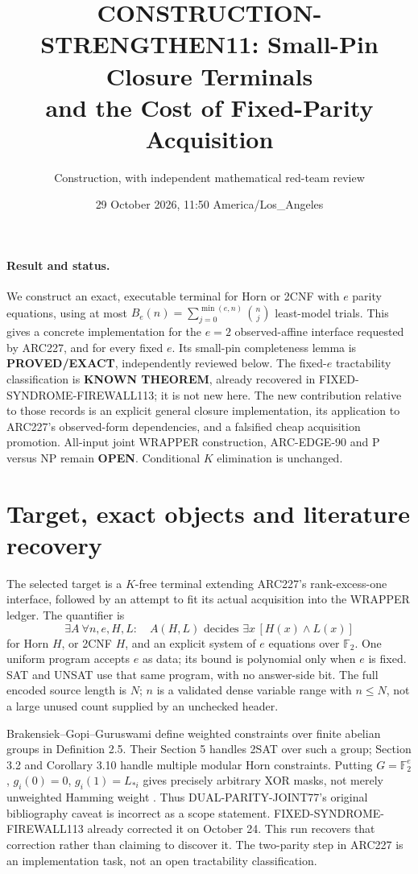 \documentclass[11pt]{article}
\title{CONSTRUCTION-STRENGTHEN11: Small-Pin Closure Terminals\\and the Cost of Fixed-Parity Acquisition}
\author{Construction, with independent mathematical red-team review}
\date{29 October 2026, 11:50 America/Los\_Angeles}
\newcommand{\F}{\mathbb F_2}
\begin{document}
\sloppy\maketitle

\paragraph{Result and status.}
We construct an exact, executable terminal for Horn or 2CNF with $e$ parity
equations, using at most $B_e(n)=\sum_{j=0}^{\min(e,n)}\binom nj$ least-model
trials. This gives a concrete implementation for the $e=2$ observed-affine
interface requested by ARC227, and for every fixed $e$. Its small-pin
completeness lemma is \textbf{PROVED/EXACT}, independently reviewed below.
The fixed-$e$ tractability classification is \textbf{KNOWN THEOREM}, already
recovered in FIXED-SYNDROME-FIREWALL113; it is not new here. The new contribution
relative to those records is an explicit general closure implementation,
its application to ARC227's observed-form dependencies, and a falsified cheap
acquisition promotion. All-input joint WRAPPER construction, ARC-EDGE-90 and
P versus NP remain \textbf{OPEN}. Conditional $K$ elimination is unchanged.

\section{Target, exact objects and literature recovery}
The selected target is a $K$-free terminal extending ARC227's rank-excess-one
interface, followed by an attempt to fit its actual acquisition into the
WRAPPER ledger. The quantifier is
\[
 \exists A\ \forall n,e,H,L:\quad
 A(H,L)\text{ decides }\exists x\,[H(x)\land L(x)]
\]
for Horn $H$, or 2CNF $H$, and an explicit system of $e$ equations over $\F$.
One uniform program accepts $e$ as data; its bound is polynomial only when
$e$ is fixed. SAT and UNSAT use that same program, with no answer-side bit.
The full encoded source length is $N$; $n$ is a validated dense variable
range with $n\le N$, not a large unused count supplied by an unchecked header.

Brakensiek--Gopi--Guruswami define weighted constraints over finite abelian
groups in Definition 2.5. Their Section 5 handles 2SAT over such a group;
Section 3.2 and Corollary 3.10 handle multiple modular Horn constraints.
Putting $G=\F^e$, $g_i(0)=0$, $g_i(1)=L_{*i}$ gives precisely arbitrary
XOR masks, not merely unweighted Hamming weight \cite{bgg}.
Thus DUAL-PARITY-JOINT77's original bibliography caveat is incorrect as a
scope statement. FIXED-SYNDROME-FIREWALL113 already corrected it on October 24.
This run recovers that correction rather than claiming to discover it.
The two-parity step in ARC227 is an implementation task, not an open
tractability classification.
\end{document}
